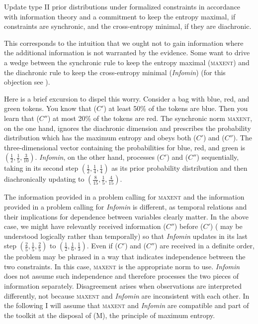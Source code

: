 \documentclass[11pt]{article}
\begin{document}

\begin{quotex}
  Update type II prior distributions under formalized constraints in
  accordance with information theory and a commitment to keep the
  entropy maximal, if constraints are synchronic, and the
  cross-entropy minimal, if they are diachronic.
\end{quotex}

This corresponds to the intuition that we ought not to gain
information where the additional information is not warranted by the
evidence. Some want to drive a wedge between the synchronic rule to
keep the entropy maximal (\textsc{maxent}) and the diachronic rule to
keep the cross-entropy minimal (\emph{Infomin}) (for this objection
see ).

Here is a brief excursion to dispel this worry. Consider a bag with
blue, red, and green tokens. You know that ($C'$) at least 50\% of the
tokens are blue. Then you learn that ($C''$) at most 20\% of the tokens
are red. The synchronic norm \textsc{maxent}, on the one hand, ignores
the diachronic dimension and prescribes the probability distribution
which has the maximum entropy and obeys both ($C'$) and ($C''$). The
three-dimensional vector containing the probabilities for blue, red,
and green is $(\frac{1}{2},\frac{1}{5},\frac{3}{10})$. \emph{Infomin},
on the other hand, processes ($C'$) and ($C''$) sequentially, taking in its
second step $(\frac{1}{2},\frac{1}{4},\frac{1}{4})$ as its prior
probability distribution and then diachronically updating to
$(\frac{8}{15},\frac{1}{5},\frac{4}{15})$.

The information provided in a problem calling for \textsc{maxent} and
the information provided in a problem calling for \emph{Infomin} is
different, as temporal relations and their implications for dependence
between variables clearly matter. In the above case, we might have
relevantly received information ($C''$) before ($C'$) ( may
be understood logically rather than temporally) so that \emph{Infomin}
updates in its last step $(\frac{2}{5},\frac{1}{5},\frac{2}{5})$ to
$(\frac{1}{2},\frac{1}{6},\frac{1}{3})$. Even if ($C'$) and ($C''$) are
received in a definite order, the problem may be phrased in a way that
indicates independence between the two constraints. In this case,
\textsc{maxent} is the appropriate norm to use. \emph{Infomin} does
not assume such independence and therefore processes the two pieces of
information separately. Disagreement arises when observations are
interpreted differently, not because \textsc{maxent} and
\emph{Infomin} are inconsistent with each other. In the following I
will assume that \textsc{maxent} and \emph{Infomin} are compatible and
part of the toolkit at the disposal of (M), the principle of maximum
entropy.
\end{document}

